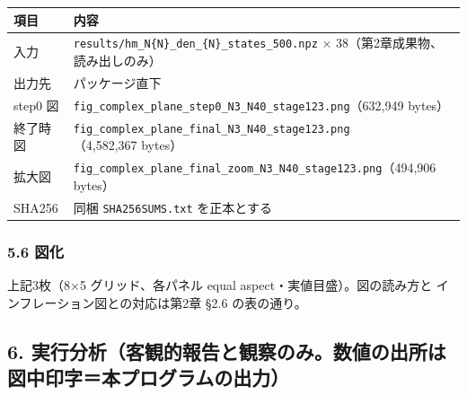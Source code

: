 \documentclass[
  a4paper,
]{ltjsarticle}
\newcounter{none} %
\begin{document}
{\def\LTcaptype{none} %
\begin{longtable}[]{@{}
  >{\raggedright\arraybackslash}p{}
  >{\raggedright\arraybackslash}p{}@{}}
\toprule\noalign{}
\begin{minipage}[b]{\linewidth}\raggedright
項目
\end{minipage} & \begin{minipage}[b]{\linewidth}\raggedright
内容
\end{minipage} \\
\midrule\noalign{}
\endhead
\bottomrule\noalign{}
\endlastfoot
入力 & \texttt{results/hm\_N\{N\}\_den\_\{N\}\_states\_500.npz} ×
38（第2章成果物、読み出しのみ） \\
出力先 & パッケージ直下 \\
step0 図 &
\texttt{fig\_complex\_plane\_step0\_N3\_N40\_stage123.png}（632,949
bytes） \\
終了時図 &
\texttt{fig\_complex\_plane\_final\_N3\_N40\_stage123.png}（4,582,367
bytes） \\
拡大図 &
\texttt{fig\_complex\_plane\_final\_zoom\_N3\_N40\_stage123.png}（494,906
bytes） \\
SHA256 & 同梱 \texttt{SHA256SUMS.txt} を正本とする \\
\end{longtable}
}

\subsubsection{5.6 図化}\label{ux56f3ux5316}

上記3枚（8×5 グリッド、各パネル equal aspect・実値目盛）。図の読み方と
インフレーション図との対応は第2章 §2.6 の表の通り。

\subsection{6.
実行分析（客観的報告と観察のみ。数値の出所は図中印字＝本プログラムの出力）}\label{ux5b9fux884cux5206ux6790ux5ba2ux89b3ux7684ux5831ux544aux3068ux89b3ux5bdfux306eux307fux6570ux5024ux306eux51faux6240ux306fux56f3ux4e2dux5370ux5b57ux672cux30d7ux30edux30b0ux30e9ux30e0ux306eux51faux529b}
\end{document}
